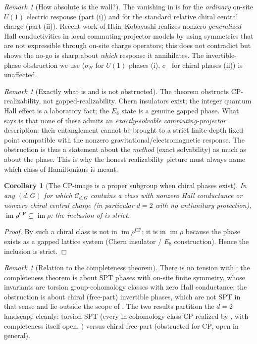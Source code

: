 \documentclass[12pt]{article}
\newcommand{\real}{\rho}                         %
\newcommand{\CP}{\mathrm{CP}}                    %
\newcommand{\im}{\operatorname{im}}
\newtheorem{corollary}[theorem]{Corollary}
\theoremstyle{definition}
\theoremstyle{remark}
\newtheorem{remark}[theorem]{Remark}
\begin{document}
\begin{remark}[How absolute is the wall?]
\label{rem:wallscope}
The vanishing in  is for the \emph{ordinary} on-site $U(1)$ electric response
(part (i)) and for the standard relative chiral central charge (part (ii)). Recent work of
Hsin--Kobayashi \cite{hsin-kobayashi-generalized} realizes nonzero \emph{generalized} Hall
conductivities in local commuting-projector models by using symmetries that are not
expressible through on-site charge operators; this does not contradict  but
shows the no-go is sharp about \emph{which} response it annihilates. The invertible-phase
obstruction we use ($\sigma_H$ for $U(1)$ phases (i), $c_-$ for chiral phases (ii)) is
unaffected.
\end{remark}

\begin{remark}[Exactly what is and is not obstructed]
\label{rem:nogo}
The theorem obstructs $\CP$-realizability, not gapped-realizability. Chern insulators exist;
the integer quantum Hall effect is a laboratory fact; the $E_8$ state is a genuine gapped
phase. What  says is that none of these admits an \emph{exactly-solvable
commuting-projector} description: their entanglement cannot be brought to a strict
finite-depth fixed point compatible with the nonzero gravitational/electromagnetic response.
The obstruction is thus a statement about the \emph{method} (exact solvability) as much as
about the phase. This is why the honest realizability picture must always name which class of
Hamiltonians is meant.
\end{remark}

\begin{corollary}[The $\CP$-image is a proper subgroup when chiral phases exist]
\label{cor:proper}
In any $(d,G)$ for which $\mathcal{C}_{d,G}$ contains a class with nonzero Hall conductance
or nonzero chiral central charge (in particular $d=2$ with no antiunitary protection),
$\im\real^{\CP}\subsetneq\im\real$: the inclusion of  is strict.
\end{corollary}

\begin{proof}
By  such a chiral class is not in $\im\real^{\CP}$; it is in $\im\real$ because
the phase exists as a gapped lattice system (Chern insulator / $E_8$ construction). Hence the
inclusion is strict.
\end{proof}

\begin{remark}[Relation to the completeness theorem]
There is no tension with : the completeness theorem is about SPT phases with
on-site finite symmetry, whose invariants are torsion group-cohomology classes with zero Hall
conductance; the obstruction is about chiral (free-part) invertible phases, which are not SPT
in that sense and lie outside the scope of . The two results partition the
$d=2$ landscape cleanly: torsion SPT (every in-cohomology class $\CP$-realized by
, with completeness itself open, ) versus chiral free part
(obstructed for $\CP$, open in general).
\end{remark}
\end{document}
